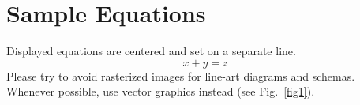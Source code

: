 
\section{Sample Equations}

\noindent Displayed equations are centered and set on a separate
line.
\begin{equation}
    x + y = z
\end{equation}
Please try to avoid rasterized images for line-art diagrams and
schemas. Whenever possible, use vector graphics instead (see
Fig.~\ref{fig1}).
